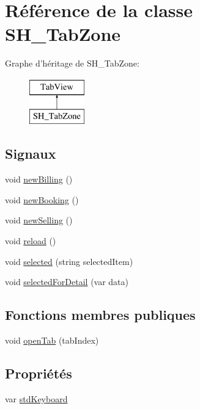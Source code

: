 \hypertarget{classSH__TabZone}{\section{Référence de la classe S\-H\-\_\-\-Tab\-Zone}
\label{classSH__TabZone}
}
Graphe d'héritage de S\-H\-\_\-\-Tab\-Zone\-:\begin{figure}[H]
\begin{center}
\leavevmode
\includegraphics[height=2.000000cm]{classSH__TabZone}
\end{center}
\end{figure}
\subsection*{Signaux}
\begin{DoxyCompactItemize}
\item 
void \hyperlink{classSH__TabZone_a6dce834477f22e68a3c35269d69d942f}{new\-Billing} ()
\item 
void \hyperlink{classSH__TabZone_aa83131a41d95f9cd16747d89c2c530aa}{new\-Booking} ()
\item 
void \hyperlink{classSH__TabZone_a12ef2e459df85b55e462a0461a5bc15b}{new\-Selling} ()
\item 
void \hyperlink{classSH__TabZone_a22fe45dad2c65c83b794df80fe34c131}{reload} ()
\item 
void \hyperlink{classSH__TabZone_ad500416727acbeb29222c15f99edb496}{selected} (string selected\-Item)
\item 
void \hyperlink{classSH__TabZone_abe3e575582494b892f3011363e8117c6}{selected\-For\-Detail} (var data)
\end{DoxyCompactItemize}
\subsection*{Fonctions membres publiques}
\begin{DoxyCompactItemize}
\item 
void \hyperlink{classSH__TabZone_a51e85d29cf8076ebd9a89304815068e3}{open\-Tab} (tab\-Index)
\end{DoxyCompactItemize}
\subsection*{Propriétés}
\begin{DoxyCompactItemize}
\item 
var \hyperlink{classSH__TabZone_a23223ca4d8158e2f50564d92364f6e14}{std\-Keyboard}
\end{DoxyCompactItemize}


